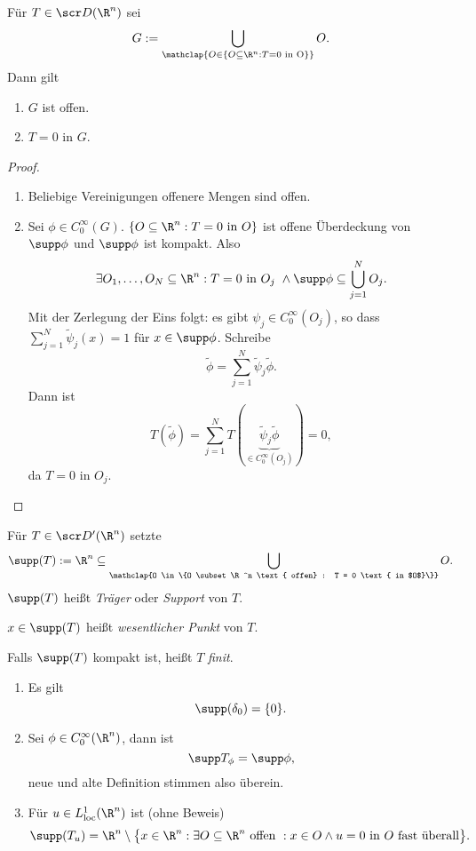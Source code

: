\begin{st} \label{5.22}
	Für $T \in \scr D(\R^n)$ sei
	\[
		G := \bigcup_{\mathclap{O \in \{O \subset \R^n : T = 0 \text{ in O}\}}} O.
	\]
	Dann gilt
	\begin{enumerate}[1)]
		\item
			$G$ ist offen.
		\item
			$T = 0$ in $G$.
	\end{enumerate}
	\begin{proof}
		\begin{enumerate}[1)]
			\item
				Beliebige Vereinigungen offenere Mengen sind offen.
			\item
				Sei $\phi \in C_0^\infty (G)$.
				$\{ O \subset \R^n : T = 0 \text{ in $O$}\}$ ist offene Überdeckung von $\supp \phi$ und $\supp \phi$ ist kompakt.
				Also
				\[
					\exists O_1, \dotsc, O_N \subset \R^n : T = 0 \text{ in $O_j$ } \land \supp \phi \subset \bigcup_{j=1}^N O_j.
				\]
				Mit der Zerlegung der Eins folgt: es gibt $\psi_j \in C_0^\infty (O_j)$, so dass $\sum_{j=1}^N \tilde \psi_j (x) = 1$ für $x \in \supp \phi$.
				Schreibe
				\[
					\tilde \phi = \sum_{j=1}^N \tilde \psi_j \tilde \phi.
				\]
				Dann ist
				\[
					T(\tilde \phi) 
					= \sum_{j=1}^N T(\underbrace{\tilde \psi_j \tilde \phi}_{\in C_0^\infty(O_j)}) 
					= 0,
				\]
				da $T = 0$ in $O_j$.
		\end{enumerate}
	\end{proof}
\end{st}

\begin{df} \label{5.23}
	Für $T \in \scr D'(\R^n)$ setzte
	\[
		\supp(T) := \R^n \subset \bigcup_{\mathclap{O \in \{O \subset \R^n \text{ offen} : T = 0 \text{ in $O$}\}}} O.
	\]
	$\supp (T)$ heißt \emph{Träger} oder \emph{Support} von $T$.

	$x \in \supp(T)$ heißt \emph{wesentlicher Punkt} von $T$.

	Falls $\supp(T)$ kompakt ist, heißt $T$ \emph{finit}.
\end{df}

\begin{ex} \label{5.24}
	\begin{enumerate}[1)]
		\item
			Es gilt
			\[
				\supp (\delta_0) = \{ 0 \}.
			\]
		\item
			Sei $\phi \in C_0^\infty(\R^n)$, dann ist
			\[
				\supp T_\phi = \supp \phi,
			\]
			neue und alte Definition stimmen also überein.
		\item
			Für $u \in L_{\text{loc}}^1(\R^n)$ ist (ohne Beweis)
			\[
				\supp(T_u) = \R^n \setminus \big\{x \in \R^n : \exists O \subset \R^n \text{ offen } : x \in O \land u = 0 \text{ in $O$ fast überall} \big\}.
			\]
	\end{enumerate}
\end{ex}

